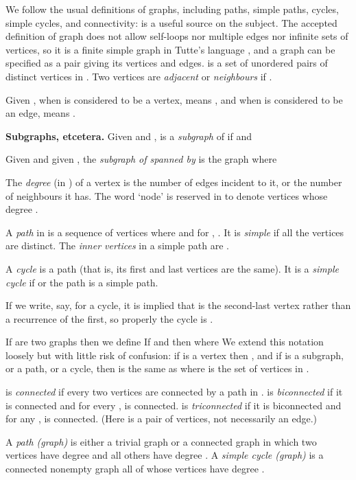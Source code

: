 We follow the usual definitions of graphs, including paths, simple paths,
cycles, simple cycles, and connectivity:
\cite{kant} is a useful source on the subject.
The accepted definition of graph does not allow self-loops nor multiple edges
nor infinite sets of vertices,
so it is a finite simple graph in Tutte's language \cite{tutte},
and a graph  can be specified as a pair  giving
its vertices and edges.  is a set of
unordered pairs of distinct vertices in .  Two vertices
 are {\em adjacent} or {\em neighbours} if
.

Given ,
when  is considered to be a  vertex,  means ,
and when  is considered to be an edge,  means .

\numpara
\label{subgraphs etcetera} {\bf Subgraphs, etcetera.}
Given  and ,  is a {\em subgraph}
of  if  and 

Given  and given , the {\em subgraph of 
spanned by } is the graph  where


The {\em degree} (in )  of a vertex  is the number of edges
incident to it, or the number of neighbours it has.
The word `node' is reserved in \cite{tutte} to denote
vertices whose degree  .

A {\em path} in  is a sequence  of vertices
where  and for , .
It is {\em simple} if all the vertices  are distinct.
The {\em inner vertices} in a simple path are
.

A {\em cycle} is a path  (that is, its
first and last vertices are the same).
It is a {\em simple cycle} if  or the path 
is a simple path.

If we write, say,  for a cycle, it is implied
that  is the second-last vertex rather than a recurrence
of the first, so properly the cycle is .

If  are
two graphs then we define 
If  and  then
 where
 We extend
this notation loosely but with little risk
of confusion: if  is a vertex then , and if  is a subgraph, or a path, or a cycle,
then  is the same as  where  is the set
of vertices in .


 is {\em connected} if every two vertices are connected
by a path in .
 is {\em biconnected} if it is
connected and for every ,  is connected.
 is {\em triconnected} if it is biconnected and
for any ,  is connected.
(Here  is a pair of vertices, not necessarily
an edge.)

A {\em path (graph)} is either a trivial graph or
a connected graph in which two vertices have degree  and all
others have degree .
A {\em simple cycle (graph)} is a connected nonempty graph all of
whose vertices have degree .

